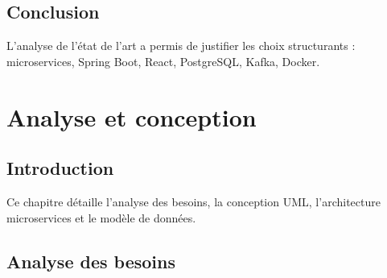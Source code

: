 \documentclass[12pt,a4paper,oneside]{report}
\begin{document}
\section{Conclusion}
L'analyse de l'état de l'art a permis de justifier les choix structurants : microservices, Spring Boot, React, PostgreSQL, Kafka, Docker.

\chapter{Analyse et conception}

\section{Introduction}
Ce chapitre détaille l'analyse des besoins, la conception UML, l'architecture microservices et le modèle de données.

\section{Analyse des besoins}
\end{document}
